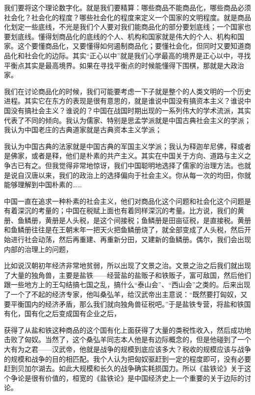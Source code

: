 \documentclass[UTF8, 12pt, a4paper]{ctexrep}
\begin{document}
我们要将这个理论数字化。就是我们要精算：哪些商品不能商品化，哪些商品必须社会化？社会化的程度？哪些社会化的程度来定义一个国家的文明程度。就是商品化划定一些底线，不光是我们个人要对我们能商品化的部分要划底线；一个国家也要划底线。懂得划商品化的底线的个人、机构和国家就是伟大的个人、机构和国家。这个要懂商品化，又要懂得如何遏制商品化；要懂社会化，但同时又要知道商品化和社会化的边际。其实“正心以中”就是我们心学最高的境界是正心以中，寻找平衡点其实是最高境界。如果在寻找平衡点的时候能懂得下围棋，那就是大政治家。

我们在讨论商品化的时候，我们可能要考虑一下子就是整个的人类文明的一个历史进程。其实它在东方的表现是很有意思的，就是谁说中国没有搞资本主义？谁说中国没有搞社会主义？谁说的？中国在战国时期出现的一系列伟大的学术流派，其实代表了不同的倾向。我认为儒家、特别是思孟学派就是中国古典社会主义的学派；我认为中国老庄的古典道家就是古典资本主义学派；

我认为中国古典的法家就是中国古典的军国主义学派；我认为释迦牟尼佛，释或者是佛家，或者是释，他们是朴素的共产主义。其实在中国关于方向、道路与主义之争古已有之。但我觉得非常地惊讶，我们中国聪明地选择了儒家的治理方法。也就是说自汉唐以来，我们的政治上的选择偏向于社会主义。你从每一次的均田，你就能够理解到中国朴素的……

中国一直在追求一种朴素的社会主义，他们对商品化这个问题和社会化这个问题是有着深沉的考量的；中国在税赋上面也有着同样深沉的考量。比方说，我们的黄册、鱼鳞册，黄册是人头税，是这个间接税；鱼鳞册是田亩征税，是直接税。黄册和鱼鳞册往往是在王朝末年一把天火把鱼鳞册烧了，就全部变成了人头税，然后开始进行社会动荡，然后再重建、再重新分田，又建新的鱼鳞册。偶尔，我们会出现内部的治理上的问题，

比如说汉朝初年经济非常地贫弱，所以出现了文景之治。文景之治之后我们就出现了大量的独角兽，主要是盐铁——经营盐的盐贩子和铁贩子，富可敌国，然后他们跟一些地方上的王勾结搞七国之乱，搞什么“泰山会”、“西山会”之类的。后来出现了一个了不起的经济专家，他叫桑弘羊，给汉武帝出主意说：“既然要打匈奴，又要平衡国内的经济矛盾，那么我们就向独角兽征税吧。”于是盐铁专营，将盐和铁国有化，国有化之后变成国有企业之后，

获得了从盐和铁这种商品的这个国有化上面获得了大量的类税性收入，然后成功地击败了匈奴。当然了，这个桑弘羊同志本人他是有边际概念的，但是他碰到了一个大有为之君——汉武帝，他就是战争的规模到底应该多大？税收的规模应该与战争的规模和战争的目的相匹配。我个人认为把匈奴驱赶到一定的程度即可，没有必要赶到贝加尔湖去。如此大规模和长久的战争确实耗损国力。所以《盐铁论》关于这个争论是很有价值的，桓宽的《盐铁论》是中国经济史上一个重要的关于边际的讨论。
\end{document}
